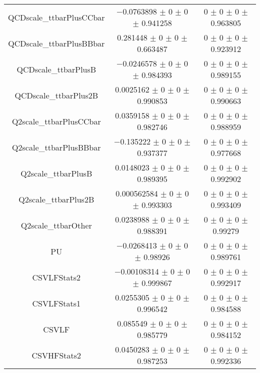 \begin{table}
\begin{tabular}{ccc}
QCDscale\_ttbarPlusCCbar 	& \num{-0.0763898} $\pm$ \num{0} $\pm$ \num{0} $\pm$ \num{0.941258} 	& \num{0} $\pm$ \num{0} $\pm$ \num{0} $\pm$ \num{0.963805}\\
QCDscale\_ttbarPlusBBbar 	& \num{0.281448} $\pm$ \num{0} $\pm$ \num{0} $\pm$ \num{0.663487} 	& \num{0} $\pm$ \num{0} $\pm$ \num{0} $\pm$ \num{0.923912}\\
QCDscale\_ttbarPlusB 	& \num{-0.0246578} $\pm$ \num{0} $\pm$ \num{0} $\pm$ \num{0.984393} 	& \num{0} $\pm$ \num{0} $\pm$ \num{0} $\pm$ \num{0.989155}\\
QCDscale\_ttbarPlus2B 	& \num{0.0025162} $\pm$ \num{0} $\pm$ \num{0} $\pm$ \num{0.990853} 	& \num{0} $\pm$ \num{0} $\pm$ \num{0} $\pm$ \num{0.990663}\\
Q2scale\_ttbarPlusCCbar 	& \num{0.0359158} $\pm$ \num{0} $\pm$ \num{0} $\pm$ \num{0.982746} 	& \num{0} $\pm$ \num{0} $\pm$ \num{0} $\pm$ \num{0.988959}\\
Q2scale\_ttbarPlusBBbar 	& \num{-0.135222} $\pm$ \num{0} $\pm$ \num{0} $\pm$ \num{0.937377} 	& \num{0} $\pm$ \num{0} $\pm$ \num{0} $\pm$ \num{0.977668}\\
Q2scale\_ttbarPlusB 	& \num{0.0148023} $\pm$ \num{0} $\pm$ \num{0} $\pm$ \num{0.989395} 	& \num{0} $\pm$ \num{0} $\pm$ \num{0} $\pm$ \num{0.992902}\\
Q2scale\_ttbarPlus2B 	& \num{0.000562584} $\pm$ \num{0} $\pm$ \num{0} $\pm$ \num{0.993303} 	& \num{0} $\pm$ \num{0} $\pm$ \num{0} $\pm$ \num{0.993409}\\
Q2scale\_ttbarOther 	& \num{0.0238988} $\pm$ \num{0} $\pm$ \num{0} $\pm$ \num{0.988391} 	& \num{0} $\pm$ \num{0} $\pm$ \num{0} $\pm$ \num{0.99279}\\
PU 	& \num{-0.0268413} $\pm$ \num{0} $\pm$ \num{0} $\pm$ \num{0.98926} 	& \num{0} $\pm$ \num{0} $\pm$ \num{0} $\pm$ \num{0.989761}\\
CSVLFStats2 	& \num{-0.00108314} $\pm$ \num{0} $\pm$ \num{0} $\pm$ \num{0.999867} 	& \num{0} $\pm$ \num{0} $\pm$ \num{0} $\pm$ \num{0.992917}\\
CSVLFStats1 	& \num{0.0255305} $\pm$ \num{0} $\pm$ \num{0} $\pm$ \num{0.996542} 	& \num{0} $\pm$ \num{0} $\pm$ \num{0} $\pm$ \num{0.984588}\\
CSVLF 	& \num{0.085549} $\pm$ \num{0} $\pm$ \num{0} $\pm$ \num{0.985779} 	& \num{0} $\pm$ \num{0} $\pm$ \num{0} $\pm$ \num{0.984152}\\
CSVHFStats2 	& \num{0.0450283} $\pm$ \num{0} $\pm$ \num{0} $\pm$ \num{0.987253} 	& \num{0} $\pm$ \num{0} $\pm$ \num{0} $\pm$ \num{0.992336}\\

\end{tabular}
\end{table}
